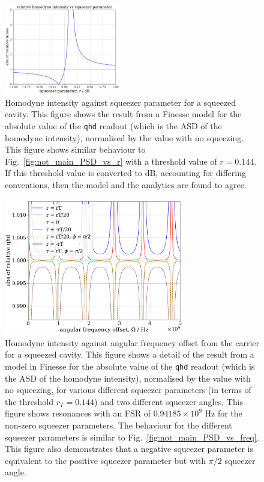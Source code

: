 \documentclass[aps,pra,superscriptaddress,reprint,nofootinbib]{revtex4-1}
\newcommand{\code}[1]{\texttt{#1}}
\begin{document}
\begin{figure}[ht]
	\begin{center}
	\includegraphics[width=0.45\textwidth]{figures/pykat_relative_qhd_vs_r.pdf}
	\end{center}
	\caption{Homodyne intensity against squeezer parameter for a squeezed cavity. This figure shows the result from a Finesse model for the absolute value of the \code{qhd} readout (which is the ASD of the homodyne intensity), normalised by the value with no squeezing. This figure shows similar behaviour to Fig.~\ref{fig:not_main_PSD_vs_r} with a threshold value of $r = 0.144$. If this threshold value is converted to dB, accounting for differing conventions, then the model and the analytics are found to agree.}
	\label{fig:pykat_relative_qhd_vs_r}
\end{figure}

\begin{figure}
	\begin{center}
	\includegraphics[width=0.7\textwidth]{figures/pykat_relative_qhd_vs_freq.pdf}
	\end{center}
	\caption{Homodyne intensity against angular frequency offset from the carrier for a squeezed cavity. This figure shows a detail of the result from a model in Finesse for the absolute value of the \code{qhd} readout (which is the ASD of the homodyne intensity), normalised by the value with no squeezing, for various different squeezer parameters (in terms of the threshold $r_T = 0.144$) and two different squeezer angles. This figure shows resonances with an FSR of $0.94185 \times 10^9$ Hz for the non-zero squeezer parameters. The behaviour for the different squeezer parameters is similar to Fig.~\ref{fig:not_main_PSD_vs_freq}. This figure also demonstrates that a negative squeezer parameter is equivalent to the positive squeezer parameter but with $\pi/2$ squeezer angle.}
	\label{fig:pykat_relative_qhd_vs_freq}
\end{figure}
\end{document}
